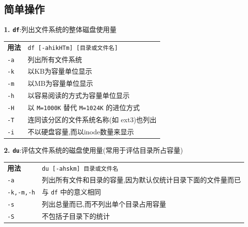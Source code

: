\subsection{简单操作}
\par
\textbf{1. \texttt{df}}:列出文件系统的整体磁盘使用量
\begin{longtable}{l@{ : }p{}}\hline\hline

    \textbf{用法} & \verb"df [-ahikHTm] [目录或文件名]"
    \\

    \texttt{-a} & 列出所有文件系统\\

    \texttt{-k} & 以KB为容量单位显示\\

    \texttt{-m} & 以MB为容量单位显示\\

    \texttt{-h} & 以容易阅读的方式为容量单位显示\\

    \texttt{-H} & 以 \texttt{M=1000K} 替代 \texttt{M=1024K} 的进位方式\\

    \texttt{-T} & 连同该分区的文件系统名称(如 ext3)也列出\\

    \texttt{-i} & 不以硬盘容量,而以inode数量来显示 \\

    \hline
\end{longtable}

\par
\textbf{2. \texttt{du}}:评估文件系统的磁盘使用量(常用于评估目录所占容量)
\begin{longtable}{l@{ : }p{}}\hline\hline

    \textbf{用法} & \verb"du [-ahskm] 目录或文件名"
    \\

    \texttt{-a} & 列出所有文件和目录的容量,因为默认仅统计目录下面的文件量而已\\

     \texttt{-k,-m,-h}  & 与 \texttt{df} 中的意义相同 \\

    \texttt{-s} & 列出总量而已,而不列出单个目录占用容量\\

    \texttt{-S} & 不包括子目录下的统计\\

    \hline
\end{longtable}


